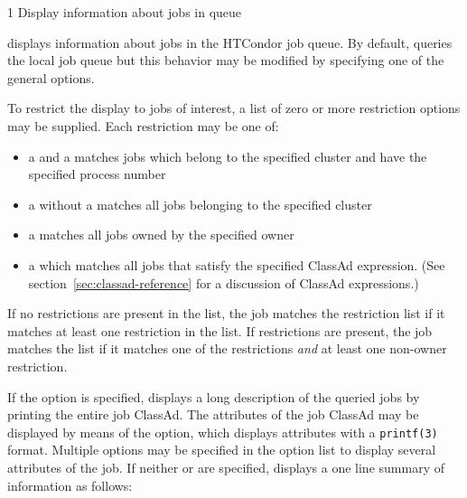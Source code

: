 \begin{ManPage}{\label{man-condor-q}}{1}
{Display information about jobs in queue}
\Synopsis {}

\ToolDebugOption
{}


\Description
{} displays information about jobs in the HTCondor job queue.  By
default,  queries the local job queue but this behavior may be 
modified by specifying one of the general options.

To restrict the display to jobs of interest, a list of zero or more 
restriction options may be supplied.  Each restriction may be one of:
\begin{itemize}
	\item a  and a  matches jobs which
		belong to the specified cluster and have the specified process number
	\item a  without a  matches all jobs belonging
		to the specified cluster
	\item a  matches all jobs owned by the specified owner
	\item a  which matches all jobs that
		satisfy the specified ClassAd expression. (See section~\ref{sec:classad-reference}
		for a discussion of ClassAd expressions.)
\end{itemize}
If no  restrictions are present in the list, the job matches the 
restriction list if it matches at least one restriction in the list.  If 
 restrictions are present, the job matches the list if it matches 
one of the  restrictions \emph{and} at least one non-owner 
restriction.

If the  option is specified,  displays a long description 
of the queried jobs by printing the entire job ClassAd.
The attributes of the job ClassAd may be displayed by means of the
 option, which displays attributes with a \verb+printf(3)+
format.
Multiple  options may be specified in the option list to display
several attributes of the job.
If neither  or  are specified,  displays a 
one line summary of information as follows:


\end{ManPage}
